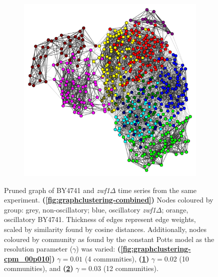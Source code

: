 \begin{figure}[htbp]
\begin{subfigure}[t]{0.33\textwidth}
    \caption{
    }
    \label{fig:graphclustering-cpm_00p020}
  \end{subfigure}%
  \begin{subfigure}[t]{0.33\textwidth}
  \centering
    \includegraphics[width=\linewidth]{graphclust_cpm_00p030_is20016.pdf}
    \caption{
    }
    \label{fig:graphclustering-cpm_00p030}
  \end{subfigure}

  \caption[
    Pruned graph of BY4741 and \textit{zwf1$\Delta$} time series from the same experiment.
  ]{
    Pruned graph of BY4741 and \textit{zwf1$\Delta$} time series from the same experiment.
    \textbf{(\ref{fig:graphclustering-combined})}
    Nodes coloured by group: grey, non-oscillatory; blue, oscillatory \textit{zwf1$\Delta$}; orange, oscillatory BY4741.
    Thickness of edges represent edge weights, scaled by similarity found by cosine distances.
    Additionally, nodes coloured by community as found by the constant Potts model \parencite{traagNarrowScopeResolutionlimitfree2011} as the resolution parameter ($\gamma$) was varied:
    \textbf{(\ref{fig:graphclustering-cpm_00p010})} $\gamma = 0.01$ (4 communities),
    \textbf{(\ref{fig:graphclustering-cpm_00p020})} $\gamma = 0.02$ (10 communities), and
    \textbf{(\ref{fig:graphclustering-cpm_00p030})} $\gamma = 0.03$ (12 communities).
  }
  \label{fig:graphclustering}
\end{figure}

